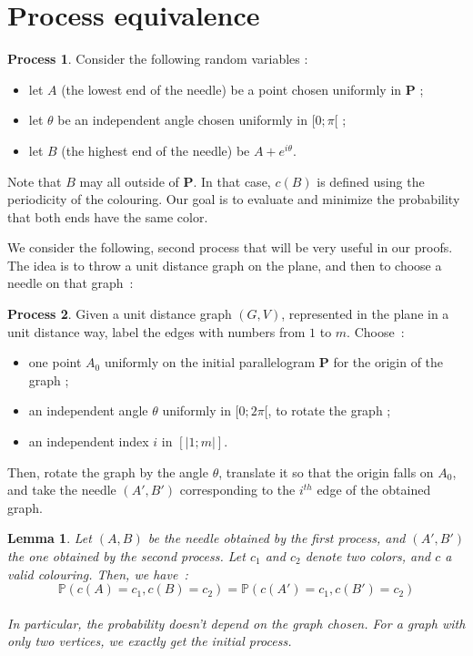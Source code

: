 \documentclass[a4paper,11pt]{article}
\newtheorem{lemma}{Lemma}
\theoremstyle{definition}
\newtheorem{process}{Process}
\theoremstyle{remark}
\begin{document}
\section{Process equivalence}
\label{equiv}
\begin{process} \label{premier}
Consider the following random variables :
\begin{itemize}
  \item let $A$ (the lowest end of the needle) be a point chosen uniformly 
  in $\mathbf{P}$ ;
  \item let $\theta$ be an independent angle chosen uniformly in $[0;\pi[$ ;
  \item let $B$ (the highest end of the needle) be $A + e^{i \theta}$.
\end{itemize}
\end{process}

Note that $B$ may all outside of $\mathbf{P}$. In that case, $c(B)$ is 
defined using the periodicity of the colouring.
Our goal is to evaluate and minimize the probability that both ends have the 
same color.

We consider the following, second process that will be very useful in our 
proofs. The idea is to throw a unit distance graph on the 
plane, and then to choose a needle on that graph~:
\begin{process}
Given a unit distance graph $(G,V)$, represented in the plane in 
a unit distance way, label the edges with numbers from 
$1$ to $m$. Choose~: 
\begin{itemize}
\item one point $A_0$ uniformly on the initial parallelogram $\mathbf{P}$ for 
the origin of the graph ;
\item an independent angle $\theta$ uniformly in $[0;2\pi[$, to rotate the graph ;
\item an independent index $i$ in $[| 1;m|]$.
\end{itemize}
Then, rotate the graph by the angle $\theta$, translate it so that the origin 
falls on  $A_0$, and take the needle $(A',B')$ corresponding to the $i^{th}$ 
edge of the obtained graph.
\end{process}

\begin{lemma}\label{huitre}
Let $(A,B)$ be the needle obtained by the first process, and
$(A',B')$ the one obtained by the second process. Let $c_1$ and $c_2$ denote 
two colors, and $c$ a valid colouring. Then, we 
have~:\\
 $$\mathbb{P}(c(A) = c_1, c(B) = c_2) = \mathbb{P}(c(A') = c_1, c(B') = c_2) $$ \\
 In particular, the probability doesn't depend on the graph 
 chosen. For a graph with only two vertices, we exactly get the initial process.
\end{lemma}
\end{document}
